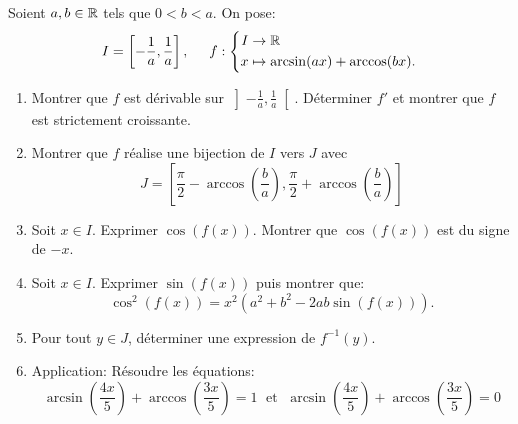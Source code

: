 Soient $a,b\in \mathbb{R}$ tels que $0<b<a$. On pose:
\begin{displaymath}
I = \left [ -\frac{1}{a}, \frac{1}{a} \right ],\hspace{0.5cm}  f:
\left\lbrace 
\begin{aligned}
  I &\to \mathbb{R}\\
  x &\mapsto \arcsin (ax) + \arccos (bx).
\end{aligned}
\right.
\end{displaymath}
\begin{enumerate}
  \item  Montrer que $f$ est dérivable sur $\left ] -\frac{1}{a}, \frac{1}{a} \right [$. Déterminer $f'$ et montrer que $f$ est strictement croissante.

  \item Montrer que $f$ réalise une bijection de  $I$ vers $J$ avec
\begin{displaymath}
  J = \left[ \frac{\pi}{2}-\arccos\left( \frac{b}{a}\right), \frac{\pi}{2} + \arccos\left( \frac{b}{a} \right) \right]
\end{displaymath}

  \item Soit $x\in I$. Exprimer $\cos (f(x))$. Montrer que $\cos (f(x))$ est du signe de $-x$. 

  \item Soit  $x\in I$. Exprimer $\sin (f(x))$ puis montrer que:
\begin{displaymath}
  \cos^{2}(f(x)) = x^{2}(a^{2}+b^{2}-2ab\sin (f(x))).
\end{displaymath}

  \item Pour tout $y\in J$, déterminer une expression de $f^{-1}(y)$.

  \item Application: Résoudre les équations:
\begin{displaymath}
\arcsin \left( \frac{4x}{5} \right ) + \arccos\left( \frac{3x}{5} \right) = 1 \; \text{ et } \; \arcsin \left( \frac{4x}{5} \right) + \arccos\left( \frac{3x}{5} \right) = 0  
\end{displaymath}

\end{enumerate}
